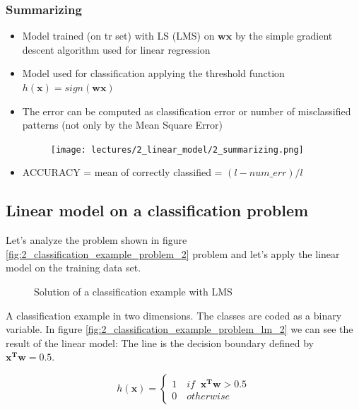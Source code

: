 \documentclass[../main.tex]{subfiles}
\begin{document}
\subsubsection{Summarizing}
\begin{itemize}
    \item Model trained (on tr set) with LS (LMS) on $\mathbf{wx}$ by the simple gradient descent algorithm used for linear regression
    
    \item Model used for classification applying the threshold function $h(\mathbf{x}) = sign(\mathbf{wx})$
    
    \item The error can be computed as classification error or number of misclassified patterns (not only by the Mean Square Error)
    \begin{figure}[H]
        \centering
        \texttt{[image: lectures/2\_linear\_model/2\_summarizing.png]}
    \end{figure}

    \item ACCURACY = mean of correctly classified = $(l-num\_err)/l$
\end{itemize}

\newpage

\subsection{Linear model on a classification problem}
Let's analyze the problem shown in figure \ref{fig:2_classification_example_problem_2} problem and let's apply the linear model on the training data set.
\begin{figure}[H]
  \centering
  \hfill
  \caption{Solution of a classification example with LMS}
\end{figure}
A classification example in two dimensions. The classes are coded as a binary variable.
In figure \ref{fig:2_classification_example_problem_lm_2} we can see the result of the linear model: The line is the decision boundary defined by $\mathbf{x^Tw} = 0.5$.

\[
    h(\textbf{x}) = \left\{
                \begin{array}{ll}
                  1 \quad if \;\; \mathbf{x^Tw}>0.5\\
                  0 \quad otherwise
                \end{array}
              \right.
\]
\end{document}
